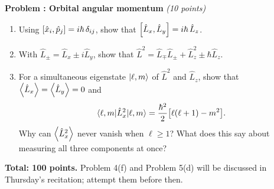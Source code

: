 \documentclass[11pt]{article}
\newcounter{problem}
\newcommand{\problem}[2]{%
  \stepcounter{problem}%
  \par\bigskip\noindent\textbf{Problem \theproblem: #1} \hfill \textit{(#2 points)}\par\smallskip}
\begin{document}
\problem{Orbital angular momentum}{10}

\begin{enumerate}
  \item Using $\comm{\hat{x}_i}{\hat{p}_j} = i\hbar\,\delta_{ij}$, show that $\comm{\hat{L}_x}{\hat{L}_y} = i\hbar\,\hat{L}_z$.
  \item With $\hat{L}_\pm = \hat{L}_x \pm i\hat{L}_y$, show that $\hat{L}^2 = \hat{L}_\mp\hat{L}_\pm + \hat{L}_z^2 \pm \hbar\hat{L}_z$.
  \item For a simultaneous eigenstate $\ket{\ell, m}$ of $\hat{L}^2$ and $\hat{L}_z$, show that $\expval{\hat{L}_x} = \expval{\hat{L}_y} = 0$ and
  \[
    \expval{\hat{L}_x^2}{\ell, m} = \frac{\hbar^2}{2}\bigl[\ell(\ell+1) - m^2\bigr].
  \]
  Why can $\expval{\hat{L}_x^2}$ never vanish when $\ell \ge 1$? What does this say about measuring all three components at once?
\end{enumerate}

\bigskip
\noindent\textbf{Total: 100 points.} Problem 4(f) and Problem 5(d) will be discussed in Thursday's recitation; attempt them before then.
\end{document}
